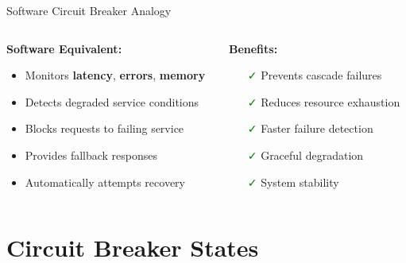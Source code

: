 \documentclass[aspectratio=169]{beamer}
\newcommand{\successgreen}[1]{\textcolor{green}{#1}}
\begin{document}
\begin{frame}{Software Circuit Breaker Analogy}
    \begin{columns}
        \begin{column}{0.5\textwidth}
            \textbf{Software Equivalent:}
            \begin{itemize}
                \item Monitors \textbf{latency}, \textbf{errors}, \textbf{memory}
                \item Detects degraded service conditions
                \item Blocks requests to failing service
                \item Provides fallback responses
                \item Automatically attempts recovery
            \end{itemize}
        \end{column}
        \begin{column}{0.5\textwidth}
            \textbf{Benefits:}
            \begin{itemize}
                \item[\successgreen{\faCheck}] Prevents cascade failures
                \item[\successgreen{\faCheck}] Reduces resource exhaustion
                \item[\successgreen{\faCheck}] Faster failure detection
                \item[\successgreen{\faCheck}] Graceful degradation
                \item[\successgreen{\faCheck}] System stability
            \end{itemize}
        \end{column}
    \end{columns}
\end{frame}

\section{Circuit Breaker States}
\end{document}
